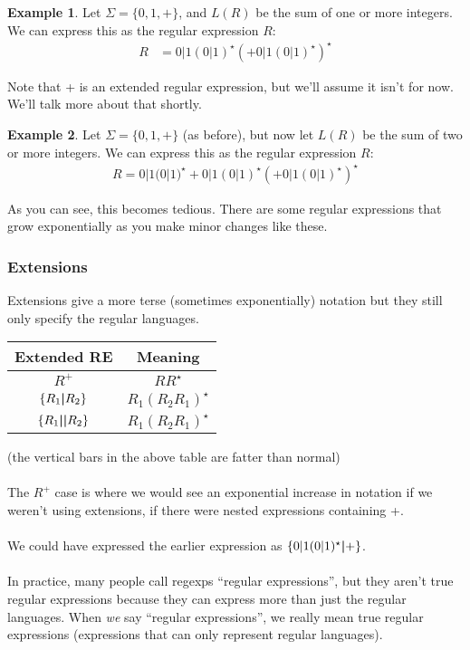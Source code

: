\documentclass[]{article}
\theoremstyle{definition}
\newtheorem{ex}{Example}[section]
\begin{document}
			\begin{ex}
				Let $\Sigma = \{ 0, 1, + \}$, and $L(R)$ be the sum of one or more integers. We can express this as the regular expression $R$:
				\begin{align*}
					R &= 0 | 1 (0 | 1)^\star{} (+ 0|1(0|1)^\star{})^\star
				\end{align*}

				Note that + is an extended regular expression, but we'll assume it isn't for now. We'll talk more about that shortly.
			\end{ex}

			\begin{ex}
				Let $\Sigma = \{ 0, 1, + \}$ (as before), but now let $L(R)$ be the sum of two or more integers. We can express this as the regular expression $R$:
				\begin{align*}
					R = 0|1(0|1)^\star{} + 0|1(0|1)^\star{} (+ 0|1(0|1)^\star{})^\star
				\end{align*}

				As you can see, this becomes tedious. There are some regular expressions that grow exponentially as you make minor changes like these.
			\end{ex}

			\subsubsection{Extensions}
				Extensions give a more terse (sometimes exponentially) notation but they still only specify the regular languages.
				
				\begin{center}
					\begin{tabular}{c|c}
						Extended RE & Meaning \\ \hline
						$R^+$ & $RR^\star$ \\
						$\{R_1 \text{\textbf{|}} R_2\}$ & $R_1(R_2R_1)^\star$ \\
						$\{R_1 \text{\textbf{||}} R_2\}$ & $R_1(R_2R_1)^\star$
					\end{tabular}
				\end{center}
				(the vertical bars in the above table are fatter than normal)
				\\ \\
				The $R^+$ case is where we would see an exponential increase in notation if we weren't using extensions, if there were nested expressions containing +.
				\\ \\
				We could have expressed the earlier expression as $\{0|1(0|1)^\star{} \text{\textbf{|}} +\}$.
				\\ \\
				In practice, many people call regexps ``regular expressions'', but they aren't true regular expressions because they can express more than just the regular languages. When \emph{we} say ``regular expressions'', we really mean true regular expressions (expressions that can only represent regular languages).
			
\end{document}
